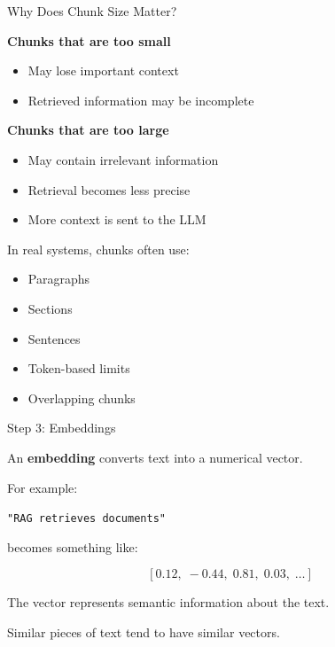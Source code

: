 \documentclass[aspectratio=169]{beamer}
\begin{document}
\begin{frame}{Why Does Chunk Size Matter?}

\textbf{Chunks that are too small}

\begin{itemize}
    \item May lose important context
    \item Retrieved information may be incomplete
\end{itemize}

\vspace{0.3cm}

\textbf{Chunks that are too large}

\begin{itemize}
    \item May contain irrelevant information
    \item Retrieval becomes less precise
    \item More context is sent to the LLM
\end{itemize}

\vspace{0.3cm}

In real systems, chunks often use:

\begin{itemize}
    \item Paragraphs
    \item Sections
    \item Sentences
    \item Token-based limits
    \item Overlapping chunks
\end{itemize}

\end{frame}

\begin{frame}{Step 3: Embeddings}

An \textbf{embedding} converts text into a numerical vector.

For example:

\begin{center}
\texttt{"RAG retrieves documents"}
\end{center}

becomes something like:

\[
[0.12,\;-0.44,\;0.81,\;0.03,\;\ldots]
\]

The vector represents semantic information about the text.

\vspace{0.3cm}

Similar pieces of text tend to have similar vectors.

\end{frame}
\end{document}
